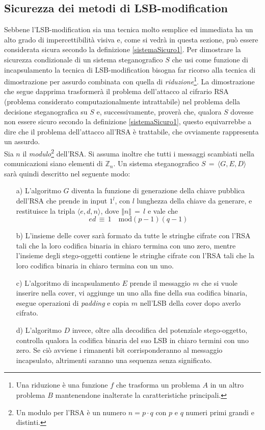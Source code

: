 \subsection{Sicurezza dei metodi di LSB-modification}
Sebbene l'LSB-modification sia una tecnica molto semplice ed immediata ha un alto grado di impercettibilità visiva e, come si vedrà in questa sezione, può essere considerata sicura secondo la definizione \ref{sistemaSicuro1}.
Per dimostrare la sicurezza condizionale di un sistema steganografico $S$ che usi come funzione di incapsulamento la tecnica di LSB-modification bisogna far ricorso alla tecnica di dimostrazione per assurdo combinata con quella di \textit{riduzione}\footnote{Una riduzione è una funzione $f$ che trasforma un problema $A$ in un altro problema $B$ mantenendone
inalterate la caratteristiche principali.}. La dimostrazione che segue dapprima trasformerà il problema dell'attacco al cifrario RSA (problema considerato computazionalmente intrattabile) nel problema della decisione steganografica su $S$ e, successivamente, proverà che, qualora $S$ dovesse non essere sicuro secondo la definizione \ref{sistemaSicuro1}, questo equivarrebbe a dire che il problema dell'attacco all'RSA è trattabile, che ovviamente rappresenta un assurdo.\\Sia $n$ il \textit{modulo}\footnote{Un modulo per l'RSA è un numero $n = p \cdot q$ con $p$ e $q$ numeri primi grandi e distinti.} dell'RSA. Si assuma inoltre che tutti i messaggi scambiati nella comunicazioni siano elementi di $\mathbb{Z}_n$. Un sistema steganografico $S \, = \, \langle G,E,D\rangle$ sarà quindi descritto nel seguente modo:
\begin{itemize}
\item[a)] L'algoritmo $G$ diventa la funzione di generazione della chiave pubblica dell'RSA che prende in input $1^l$, con $l$ lunghezza della chiave da generare, e restituisce la tripla $\langle e, d, n\rangle$, dove $\Vert n\Vert \, = \, l$ e vale che
\[ ed \, \equiv \, 1 \quad \mathrm{mod}(p-1)(q-1) \]
\item[b)] L'insieme delle cover sarà formato da tutte le stringhe cifrate con l'RSA tali che la loro codifica binaria in chiaro termina con uno zero, mentre l'insieme degli stego-oggetti contiene le stringhe cifrate con l'RSA tali che la loro codifica binaria in chiaro termina con un uno.
\item[c)] L'algoritmo di incapsulamento $E$ prende il messaggio $m$ che si vuole inserire nella cover, vi aggiunge un uno alla fine della sua codifica binaria, esegue operazioni di \textit{padding} e copia $m$ nell'LSB della cover dopo averlo cifrato.
\item[d)] L'algoritmo $D$ invece, oltre alla decodifica del potenziale stego-oggetto, controlla qualora la codifica binaria del suo LSB in chiaro termini con uno zero. Se ciò avviene i rimanenti bit corrisponderanno al messaggio incapsulato, altrimenti saranno una sequenza senza significato.
\end{itemize} 
